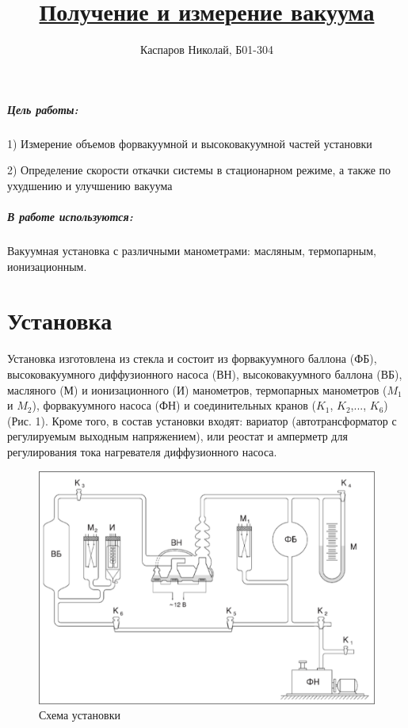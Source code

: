 \documentclass[a4paper]{article}
\title{\underline{Получение и измерение вакуума}}
\author{Каспаров Николай, Б01-304}
\begin{document}
\maketitle
\begin{center}
\Large{\textbf{ }}
\end{center}

\subparagraph{Цель работы:}

1) Измерение объемов форвакуумной и высоковакуумной частей установки

2) Определение скорости откачки системы в стационарном режиме,
а также по ухудшению и улучшению вакуума

\subparagraph{В работе используются:}

Вакуумная установка с различными манометрами: масляным, термопарным, ионизационным.

\section{Установка}

Установка изготовлена из стекла и состоит из форвакуумного баллона
(ФБ), высоковакуумного диффузионного насоса (ВН), высоковакуумного
баллона (ВБ), масляного (М) и ионизационного (И) манометров, термопарных
манометров ($M_1$ и $M_2$), форвакуумного насоса (ФН) и соединительных
кранов ($K_1$, $K_2$,..., $K_6$) (Рис. 1). Кроме того, в состав установки входят:
вариатор (автотрансформатор с регулируемым выходным напряжением), или
реостат и амперметр для регулирования тока нагревателя диффузионного
насоса.


\begin{figure}[h]
    \centering
    \includegraphics[scale=0.7]{ust.png}
    \caption{Схема установки}
\end{figure}
\end{document}

